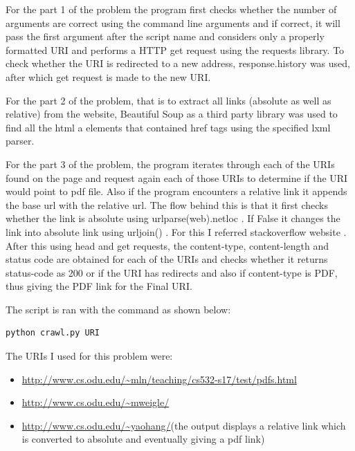 \documentclass[letterpaper,12pt]{article}
\begin{document}
For the part 1 of the problem the program first checks whether the number of arguments are correct using the command line arguments and if correct, it will pass the first argument after the script name  and considers only a properly formatted URI and performs a HTTP get request using the requests library. To check whether the URI is redirected to a new address, response.history \cite{historyref} was used, after which get request is made to the new URI.

For the part 2 of the problem, that is to extract all links (absolute as well as relative) from the website, Beautiful Soup \cite{beautifulsoupref} as a third party library was used to find all the html a elements that contained href tags using the specified lxml parser.

For the part 3 of the problem, the program iterates through each of the URIs found on the page and request again each of those URIs to determine if the URI would point to pdf file.  Also if the program encounters a relative link it appends the base url with the relative url. The flow behind this is that it first checks whether the link is absolute using urlparse(web).netloc \cite{urllibref}. If False it changes the link into absolute link using urljoin() \cite{parseref}. For this I referred stackoverflow website \cite{urlref}. After this using head and get requests, the content-type, content-length and status code are obtained for each of the URIs and checks whether it returns status-code \cite{urllibref} as 200 or if the URI has redirects \cite{historyref} and also if content-type \cite{urllibref} is PDF, thus giving the PDF link for the Final URI.

The script is ran with the command as shown below: 

\begin{lstlisting}[frame=single]
python crawl.py URI
\end{lstlisting}

The URIs I used for this problem were:

\begin{itemize}
  \item \url{http://www.cs.odu.edu/~mln/teaching/cs532-s17/test/pdfs.html}
  \item \url{http://www.cs.odu.edu/~mweigle/}
  \item \url{http://www.cs.odu.edu/~yaohang/}(the output displays a relative link which is converted to absolute and eventually giving a pdf link)
\end{itemize}
\end{document}
